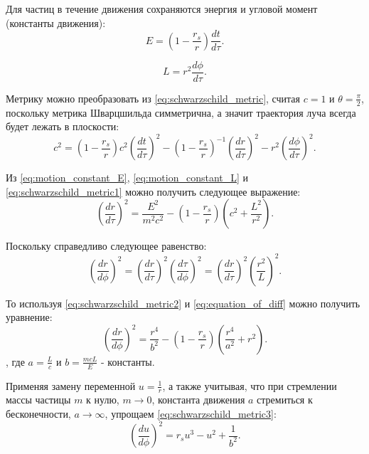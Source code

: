 Для частиц в течение движения сохраняются энергия и угловой момент (константы движения):
\begin{equation}
\label{eq:motion_constant_E}
    E = \left(1-\frac{r_s}{r}\right)\frac{dt}{d\tau}.
\end{equation}

\begin{equation}
\label{eq:motion_constant_L}
    L = r^2\frac{d\phi}{d\tau}.
\end{equation}

Метрику можно преобразовать из \eqref{eq:schwarzschild_metric}, считая $c = 1$ и $\theta=\frac{\pi}{2}$, поскольку метрика Шварцшильда симметрична, а значит траектория луча всегда будет лежать в плоскости:
\begin{equation}
\label{eq:schwarzschild_metric1}
    c^2 = \left(1-\frac{r_s}{r}\right)c^2\left(\frac{dt}{d\tau}\right)^2 - \left(1-\frac{r_s}{r}\right)^{-1}\left(\frac{dr}{d\tau}\right)^2 - r^2\left(\frac{d\phi}{d\tau}\right)^2.
\end{equation}

Из \eqref{eq:motion_constant_E}, \eqref{eq:motion_constant_L} и \eqref{eq:schwarzschild_metric1} можно получить следующее выражение:
\begin{equation}
\label{eq:schwarzschild_metric2}
    \left(\frac{dr}{d\tau}\right)^2 = \frac{E^2}{m^2c^2} - \left(1-\frac{r_s}{r}\right)\left(c^2+\frac{L^2}{r^2}\right).
\end{equation}

Поскольку справедливо следующее равенство:
\begin{equation}
\label{eq:equation_of_diff}
    \left(\frac{dr}{d\phi}\right)^2 = \left(\frac{dr}{d\tau}\right)^2\left(\frac{d\tau}{d\phi}\right)^2 = \left(\frac{dr}{d\tau}\right)^2\left(\frac{r^2}{L}\right)^2.
\end{equation}

То используя \eqref{eq:schwarzschild_metric2} и \eqref{eq:equation_of_diff} можно получить уравнение:
\begin{equation}
\label{eq:schwarzschild_metric3}
    \left(\frac{dr}{d\phi}\right)^2 = \frac{r^4}{b^2} - \left(1-\frac{r_s}{r}\right)\left(\frac{r^4}{a^2} + r^2\right).
\end{equation}
, где $a = \frac{L}{c}$ и $b = \frac{mcL}{E}$ - константы.

Применяя замену переменной $u = \frac{1}{r}$, а также учитывая, что при стремлении массы частицы $m$ к нулю, $m \longrightarrow 0$, константа движения $a$ стремиться к бесконечности, $a \longrightarrow \infty$, упрощаем \eqref{eq:schwarzschild_metric3}:
\begin{equation}
\label{eq:schwarzschild_metric4}
    \left(\frac{du}{d\phi}\right)^2 = r_su^3 - u^2 + \frac{1}{b^2}.
\end{equation}

